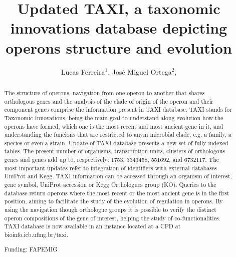 \documentclass[twoside]{article}
\title{\vspace{-15mm}\fontsize{24pt}{10pt}\selectfont\textbf{ Updated TAXI, a taxonomic innovations database depicting operons structure and evolution }} %
\author{ Lucas Ferreira$^{1}$, José Miguel Ortega$^{2}$, }
\affil{ 1 SGC - Structural Genomics Consortium, Unicamp

2 Universidade Federal de Minas Gerais. Laboratório de Biodados

 }
\date{}
\begin{document}
  
  
  \maketitle %
  
  
  \thispagestyle{fancy} %
  
  
  \begin{abstract}
  The structure of operons, navigation from one operon to another that shares orthologous genes and the analysis of the clade of origin of the operon and their component genes comprise the information present in TAXI database. TAXI stands for Taxonomic Innovations, being the main goal to understand along evolution how the operons have formed, which one is the most recent and most ancient gene in it, and understanding the funcions that are restricted to anym microbial clade, e.g. a family, a species or even a strain. Update of TAXI database presents a new set of fully indexed tables. The present number of organisms, transcription units, clusters of orthologous genes and genes add up to, respectively: 1753, 3343458, 551692, and 6732117. The most important updates refer to integration of identifiers with external databases UniProt and Kegg. TAXI information can be accessed through an organism of interest, gene symbol, UniProt accession or Kegg Orthologues group (KO). Queries to the database return operons where the most recent or the most ancient gene is in the first position, aiming to facilitate the study of the evolution of regulation in operons. By using the navigation though orthologue groups it is possible to verify the distinct operon compositions of the gene of interest, helping the study of co-functionalities. TAXI database is now available in an instance located at a CPD at bioinfo.icb.ufmg.br/taxi.
  
  Funding: FAPEMIG \\ 
  \end{abstract}
  
\end{document}
